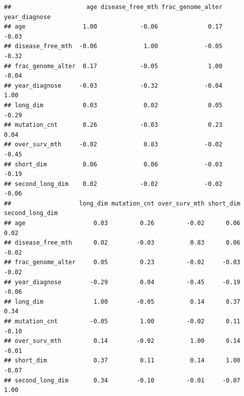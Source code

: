 \documentclass[]{article}
\newenvironment{Shaded}{\begin{snugshade}}{\end{snugshade}}
\newcommand{\KeywordTok}[1]{\textcolor[rgb]{0.13,0.29,0.53}{\textbf{#1}}}
\newcommand{\DataTypeTok}[1]{\textcolor[rgb]{0.13,0.29,0.53}{#1}}
\newcommand{\DecValTok}[1]{\textcolor[rgb]{0.00,0.00,0.81}{#1}}
\newcommand{\StringTok}[1]{\textcolor[rgb]{0.31,0.60,0.02}{#1}}
\newcommand{\CommentTok}[1]{\textcolor[rgb]{0.56,0.35,0.01}{\textit{#1}}}
\newcommand{\OperatorTok}[1]{\textcolor[rgb]{0.81,0.36,0.00}{\textbf{#1}}}
\newcommand{\NormalTok}[1]{#1}
\begin{document}
\begin{Shaded}
\end{Shaded}

\begin{verbatim}
##                     age disease_free_mth frac_genome_alter year_diagnose
## age                1.00            -0.06              0.17         -0.03
## disease_free_mth  -0.06             1.00             -0.05         -0.32
## frac_genome_alter  0.17            -0.05              1.00         -0.04
## year_diagnose     -0.03            -0.32             -0.04          1.00
## long_dim           0.03             0.02              0.05         -0.29
## mutation_cnt       0.26            -0.03              0.23          0.04
## over_surv_mth     -0.02             0.83             -0.02         -0.45
## short_dim          0.06             0.06             -0.03         -0.19
## second_long_dim    0.02            -0.02             -0.02         -0.06
##                   long_dim mutation_cnt over_surv_mth short_dim second_long_dim
## age                   0.03         0.26         -0.02      0.06            0.02
## disease_free_mth      0.02        -0.03          0.83      0.06           -0.02
## frac_genome_alter     0.05         0.23         -0.02     -0.03           -0.02
## year_diagnose        -0.29         0.04         -0.45     -0.19           -0.06
## long_dim              1.00        -0.05          0.14      0.37            0.34
## mutation_cnt         -0.05         1.00         -0.02      0.11           -0.10
## over_surv_mth         0.14        -0.02          1.00      0.14           -0.01
## short_dim             0.37         0.11          0.14      1.00           -0.07
## second_long_dim       0.34        -0.10         -0.01     -0.07            1.00
\end{verbatim}
\end{document}

